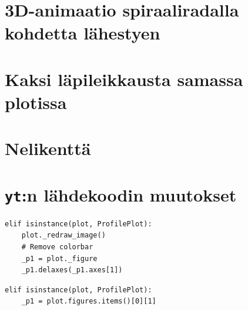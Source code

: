 \documentclass[12pt,a4paper]{article}
\newcommand{\yt}{\texttt{yt}}
\begin{document}

\small

\appendix
%
\section{3D-animaatio spiraaliradalla kohdetta lä\-hes\-tyen} \label{koodi:volume-spiraali}

\newpage

\section{Kaksi läpileikkausta samassa plotissa} \label{koodi:multiplot-simppeli}

\newpage

\section{Nelikenttä} \label{koodi:multiplot-nelikentta}

\newpage


\section{\yt:n lähdekoodin muutokset} \label{liite:muutokset}

\begin{minipage}{\textwidth}
\begin{lstlisting}
elif isinstance(plot, ProfilePlot):
	plot._redraw_image()
	# Remove colorbar
	_p1 = plot._figure
	_p1.delaxes(_p1.axes[1])
\end{lstlisting}
\end{minipage}

\begin{minipage}{\textwidth}
\begin{lstlisting}
elif isinstance(plot, ProfilePlot):
	_p1 = plot.figures.items()[0][1]
\end{lstlisting}
\end{minipage}


\end{document}

